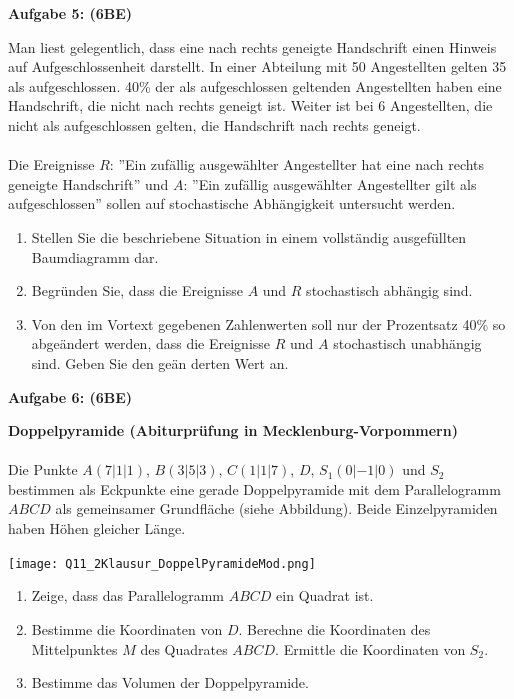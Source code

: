 \documentclass[a4paper,12pt]{article}
\newcommand{\Aufgabe}[1]{
  {
  \vspace*{0.5cm}
  \textsf{\textbf{Aufgabe #1}}
  \vspace*{0.2cm}
  
  }
}
\begin{document}
\vspace{2cm}

\Aufgabe{5: (6BE)}
Man liest gelegentlich, dass eine nach rechts geneigte Handschrift einen Hinweis auf Aufgeschlossenheit darstellt. In einer Abteilung mit 50 Angestellten gelten 35 als aufgeschlossen. 40\% der als aufgeschlossen geltenden Angestellten haben eine Handschrift, die nicht nach rechts geneigt ist. Weiter ist bei 6 Angestellten, die nicht als aufgeschlossen gelten, die Handschrift nach rechts geneigt.\\
\\
Die Ereignisse $R$: ''Ein zufällig ausgewählter Angestellter hat eine nach rechts geneigte Handschrift'' und $A$: ''Ein zufällig ausgewählter Angestellter gilt als aufgeschlossen'' sollen auf stochastische Abhängigkeit untersucht werden.

\begin{enumerate}[label={\alph*)}]
  \item Stellen Sie die beschriebene Situation in einem vollständig ausgefüllten Baumdiagramm dar.
  \item Begründen Sie, dass die Ereignisse $A$ und $R$ stochastisch abhängig sind. 
  \item Von den im Vortext gegebenen Zahlenwerten soll nur der Prozentsatz 40\% so abgeändert werden, dass die Ereignisse $R$ und $A$ stochastisch unabhängig sind. Geben Sie den geän derten Wert an.
\end{enumerate}


\vspace{2cm}

\Aufgabe{6: (6BE)}
\textbf{Doppelpyramide (Abiturprüfung in Mecklenburg-Vorpommern)}\\
\\
Die Punkte $A(7|1|1)$, $B(3|5|3)$, $C(1|1|7)$, $D$, $S_1(0|-1|0)$ und $S_2$ bestimmen als Eckpunkte eine gerade Doppelpyramide mit dem Parallelogramm $ABCD$ als gemeinsamer Grundfläche (siehe Abbildung). Beide Einzelpyramiden haben Höhen gleicher Länge.

\texttt{[image: Q11\_2Klausur\_DoppelPyramideMod.png]}

\begin{enumerate}[label={\alph*)}]
  \item Zeige, dass das Parallelogramm $ABCD$ ein Quadrat ist.
  \item Bestimme die Koordinaten von $D$. Berechne die Koordinaten des Mittelpunktes $M$ des Quadrates $ABCD$. Ermittle die Koordinaten von $S_2$.
  \item Bestimme das Volumen der Doppelpyramide.
\end{enumerate}
\end{document}
